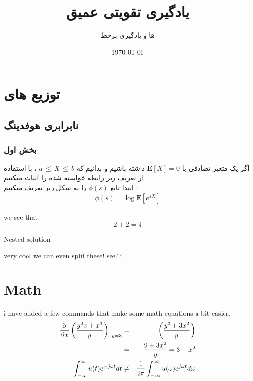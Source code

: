 \documentclass[12pt]{article}
\title{یادگیری تقویتی عمیق}
\subtitle{\lr{Bandit} ها و یادگیری برخط}
\date{\today}
\begin{document}
\maketitlepage
\maketitlestart



\section{توزیع های }
\subsection{نابرابری هوفدینگ}
\subsubsection*{بخش اول}
اگر یک متغیر تصادفی 
 با $\mathbf{E}\left[X\right] = 0$ داشته باشیم و بدانیم که
 $ a \, \leq \, X \, \leq \, b$  ، با استفاده از تعریف زیر رابطه خواسته شده را اثبات میکنیم.\\
 ابتدا تابع $\phi(s)$ را به شکل زیر تعریف میکنیم :
 \begin{align}
    \phi(s) = \log \mathbf{E}\left[e^{sX}\right]
 \end{align}
\begin{qsolve}[My conclusion]
	we see that $$2+2=4$$
	\begin{qsolve}[]
		Nested solution
	\end{qsolve}
    very cool we can even split these!
    \splitqsolve
    see??
\end{qsolve}
\vfil
\begin{conclusion}
	\blindtext
\end{conclusion}
\clearpage
\section*{Math}
i have added a few commands that make some math equations
a bit easier.
\begin{eqnarray*}
	\pderivv{\frac{y^2x+x^3}{y}}{x}\Big|_{y=3} &=& \left(\frac{y^2+3x^2}{y}\right)\\
	&=& \frac{9+3x^2}{y} = 3 + x^2\\
	\fourier{u(t)} &\neq& \ifourier{u(\omega)}
\end{eqnarray*}
\end{document}
